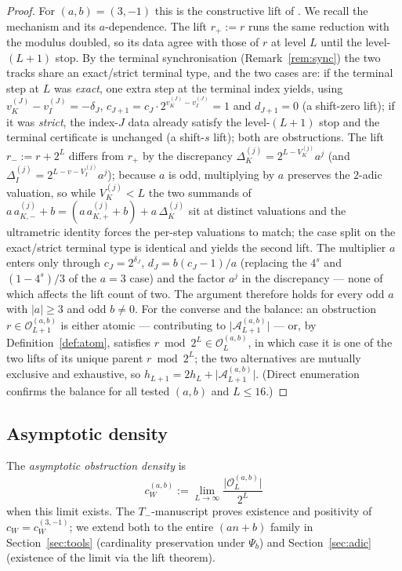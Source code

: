 \documentclass[11pt,reqno]{amsart}
\theoremstyle{plain}
\theoremstyle{definition}
\theoremstyle{remark}
\newcommand{\Tneg}{T_{-}}
\newcommand{\Obs}{\mathcal{O}}
\newcommand{\Atom}{\mathcal{A}}
\newcommand{\Vk}{V_{K}}
\newcommand{\Vi}{V_{I}}
\newcommand{\vk}{v_{K}}
\newcommand{\vi}{v_{I}}
\newcommand{\Psib}{\Psi_{b}}
\newcommand{\cWab}{c_{W}^{(a,b)}}
\newcommand{\Obsab}{\Obs_{L}^{(a,b)}}
\begin{document}
\begin{proof}
For $(a,b) = (3,-1)$ this is the constructive lift of
\cite[Theorems~3.1 and~3.2]{ObstructionResidues2026}. We recall the mechanism and
its $a$-dependence. The lift $r_+ := r$ runs the same reduction with the
modulus doubled, so its data agree with those of $r$ at level $L$ until
the level-$(L+1)$ stop. By the terminal synchronisation
(Remark~\ref{rem:sync}) the two tracks share an exact/strict terminal type,
and the two cases are: if the terminal step at $L$ was \emph{exact}, one
extra step at the terminal index yields, using
$\vk^{(J)} - \vi^{(J)} = -\delta_J$,
$c_{J+1} = c_J \cdot 2^{\vk^{(J)} - \vi^{(J)}} = 1$ and $d_{J+1} = 0$ (a
shift-zero lift); if it was \emph{strict}, the index-$J$ data already satisfy
the level-$(L+1)$ stop and the terminal certificate is unchanged (a
shift-$s$ lift); both are obstructions. The
lift $r_- := r + 2^L$ differs from $r_+$ by the discrepancy
$\Delta_K^{(j)} = 2^{L - \Vk^{(j)}} a^j$ (and $\Delta_I^{(j)} =
2^{L - v - \Vi^{(j)}} a^j$); because $a$ is odd, multiplying by $a$
preserves the $2$-adic valuation, so while $\Vk^{(j)} < L$ the two
summands of $a\,a_{K,-}^{(j)} + b = (a\,a_{K,+}^{(j)} + b) + a\,\Delta_K^{(j)}$
sit at distinct valuations and the ultrametric identity forces the
per-step valuations to match; the case split on the exact/strict terminal
type is identical and yields the second lift. The multiplier $a$ enters only
through $c_J = 2^{\delta_J}$, $d_J = b(c_J - 1)/a$ (replacing the $4^{s}$
and $(1 - 4^{s})/3$ of the $a = 3$ case) and the factor $a^j$ in the
discrepancy --- none of which affects the lift count of two. The argument
therefore holds for every odd $a$ with $\lvert a \rvert \ge 3$ and odd
$b \ne 0$. For the converse and the balance: an obstruction
$r \in \Obs_{L+1}^{(a,b)}$ is either atomic --- contributing to
$\lvert \Atom_{L+1}^{(a,b)} \rvert$ --- or, by Definition~\ref{def:atom},
satisfies $r \bmod 2^{L} \in \Obsab$, in which case it is one of the two
lifts of its unique parent $r \bmod 2^{L}$; the two alternatives are mutually
exclusive and exhaustive, so $h_{L+1} = 2 h_L + \lvert \Atom_{L+1}^{(a,b)}
\rvert$. (Direct enumeration confirms the balance for all tested $(a,b)$ and
$L \le 16$.) \qedhere
\end{proof}

\subsection{Asymptotic density}

The \emph{asymptotic obstruction density} is
\[
\cWab := \lim_{L \to \infty} \frac{\lvert \Obsab \rvert}{2^L}
\]
when this limit exists. The $\Tneg$-manuscript proves existence and positivity
of $c_W = c_W^{(3,-1)}$; we extend both to the entire $(an+b)$ family in
Section~\ref{sec:tools} (cardinality preservation under $\Psib$) and
Section~\ref{sec:adic} (existence of the limit via the lift theorem).
\end{document}
